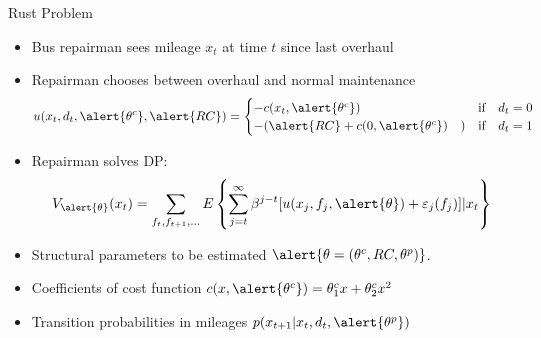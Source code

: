 \documentclass[aspectratio=169,11pt]{beamer}
\begin{document}
\begin{frame}{Rust Problem}
\footnotesize
\begin{itemize}
\item Bus repairman sees mileage $x_t$ at time $t$ since last overhaul
\item Repairman chooses between overhaul and normal maintenance
\begin{align*}
u(x_t, d_t, \alert{\theta^c}, \alert{RC}) =
\begin{cases} -c(x_t,\alert{\theta^c}) \quad &\mbox{if} \quad d_t=0\\
-(\alert{RC} + c(0,\alert{\theta^c}) \quad) &\mbox{if} \quad d_t =1\\
\end{cases}
\end{align*}
\item Repairman solves DP:
\begin{align*}
V_{\alert{\theta}} (x_t) = \sum_{f_t,f_{t+1},\ldots} E \left\{  \sum_{j=t}^{\infty} \beta^{j-t}   [u(x_j,f_j,\alert{\theta}) + \varepsilon_{j}(f_j)]| x_t \right\}
\end{align*}
\end{itemize}
\begin{itemize}
\item Structural parameters to be estimated $\alert{\theta = (\theta^c, RC, \theta^p)}$.
\item Coefficients of cost function $c(x,\alert{\theta^c}) = \theta^c_1 x + \theta^c_2 x^2$
\item Transition probabilities in mileages $p(x_{t+1} | x_t, d_t, \alert{\theta^p})$
\end{itemize}
\end{frame}
\end{document}
